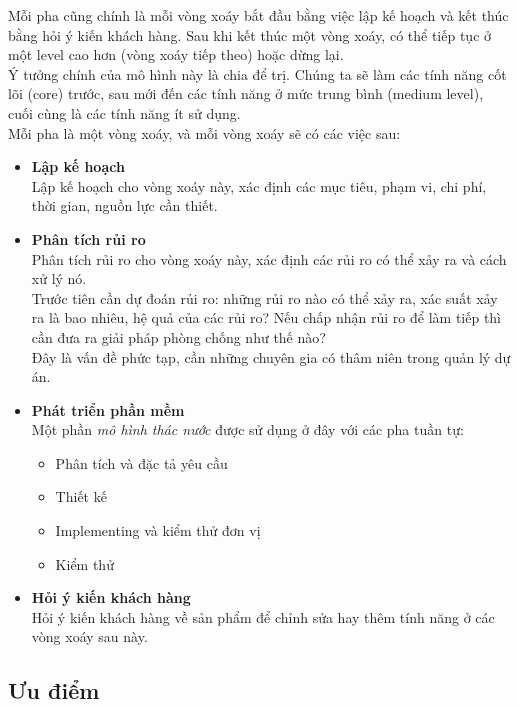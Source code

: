 \documentclass[14pt]{extarticle}
\begin{document}
Mỗi pha cũng chính là mỗi vòng xoáy bắt đầu bằng việc lập kế hoạch
và kết thúc bằng hỏi ý kiến khách hàng. Sau khi kết thúc một vòng xoáy,
có thể tiếp tục ở một level cao hơn (vòng xoáy tiếp theo) hoặc dừng lại.\\
Ý tưởng chính của mô hình này là chia để trị. Chúng ta sẽ làm các tính
năng cốt lõi (core) trước, sau mới đến các tính năng ở mức trung bình
(medium level), cuối cùng là các tính năng ít sử dụng.\\

Mỗi pha là một vòng xoáy, và mỗi vòng xoáy sẽ có các việc sau:
\begin{itemize}
  \item \textbf{Lập kế hoạch}\\
        Lập kế hoạch cho vòng xoáy này, xác định các mục tiêu, phạm vi,
        chi phí, thời gian, nguồn lực cần thiết.
  \item \textbf{Phân tích rủi ro}\\
        Phân tích rủi ro cho vòng xoáy này, xác định các rủi ro có thể
        xảy ra và cách xử lý nó.\\
        Trước tiên cần dự đoán rủi ro: những rủi ro nào có thể
        xảy ra, xác suất xảy ra là bao nhiêu, hệ quả của các rủi ro?
        Nếu chấp nhận rủi ro để làm tiếp thì cần đưa ra giải pháp phòng chống
        như thế nào?\\
        Đây là vấn đề phức tạp, cần những chuyên gia có thâm niên trong quản lý
        dự án.

  \item \textbf{Phát triển phần mềm}\\
        Một phần \textit{mô hình thác nước} được sử dụng ở đây với các pha tuần tự:
        \begin{itemize}
          \item Phân tích và đặc tả yêu cầu
          \item Thiết kế
          \item Implementing và kiểm thử đơn vị
          \item Kiểm thử
        \end{itemize}

  \item \textbf{Hỏi ý kiến khách hàng}\\
        Hỏi ý kiến khách hàng về sản phẩm để chỉnh sửa hay thêm
        tính năng ở các vòng xoáy sau này.
\end{itemize}

\subsection{Ưu điểm}
\end{document}
